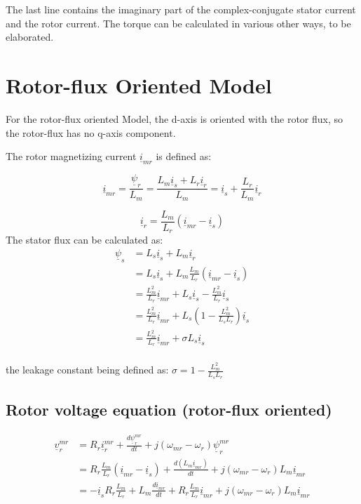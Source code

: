 \documentclass[]{book}
\begin{document}
The last line contains the imaginary part of the complex-conjugate stator current and the rotor current.
The torque can be calculated in various other ways, to be elaborated.

\hypertarget{rotor-flux-oriented-model}{%
\section{Rotor-flux Oriented Model}\label{rotor-flux-oriented-model}}

For the rotor-flux oriented Model, the d-axis is oriented with the rotor flux, so the rotor-flux has no q-axis component.

The rotor magnetizing current \(\underline{i}_{mr}\) is defined as:

\[
\underline{i}_{mr} = \frac{\underline{\psi}_r}{L_m}= \frac{L_m\underline{i}_s+L_r\underline{i}_r}{L_m}
= \underline{i}_s+ \frac{L_r}{L_m}\underline{i}_r
\label{eq:rotorFluxFlux1}
\]

\[
\underline{i}_r = \frac{L_m}{L_r} (\underline{i}_{mr} -  \underline{i}_s)
\label{eq:rotorFluxFlux2}
\]
The stator flux can be calculated as:
\[
\begin{aligned}
\underline{\psi}_s
& = L_s\underline{i}_s + L_m\underline{i}_r \\
& = L_s\underline{i}_s + L_m \frac{L_m}{L_r} (\underline{i}_{mr} -  \underline{i}_s) \\
& =  \frac{L^2_m}{L_r}\underline{i}_{mr}  + L_s\underline{i}_s - \frac{L^2_m}{L_r}  \underline{i}_s \\
& =  \frac{L^2_m}{L_r}\underline{i}_{mr}  + L_s(1 - \frac{L^2_m}{L_s L_r} ) \underline{i}_s \\
& =  \frac{L^2_m}{L_r}\underline{i}_{mr}  + \sigma L_s \underline{i}_s  \\
\end{aligned}
\label{eq:rotorFluxFlux3}
\]

the leakage constant being defined as: \(\sigma=1 - \frac{L^2_m}{L_s L_r}\)

\hypertarget{rotor-voltage-equation-rotor-flux-oriented}{%
\subsection{Rotor voltage equation (rotor-flux oriented)}\label{rotor-voltage-equation-rotor-flux-oriented}}

\[
\begin{aligned}
\underline{v}^{mr}_r  & = R_r \underline{i}^{mr}_r  + \frac{d\underline{\psi}^{mr}_r}{dt} + j (\omega_{mr}-\omega_r) \underline{\psi}^{mr}_r    \\
& = R_r  \frac{L_m}{L_r} (\underline{i}_{mr} -  \underline{i}_s) + \frac{d ( L_m \underline{i}_{mr}) }{dt} + j (\omega_{mr}-\omega_r) L_m \underline{i}_{mr} \\
& =  -\underline{i}_s R_r  \frac{L_m}{L_r}  + L_m \frac{d  \underline{i}_{mr} }{dt} + R_r  \frac{L_m}{L_r} \underline{i}_{mr}  + j (\omega_{mr}-\omega_r) L_m \underline{i}_{mr} \\
\end{aligned}
\label{eq:rotorFluxRotVolt1}
\]
\end{document}
